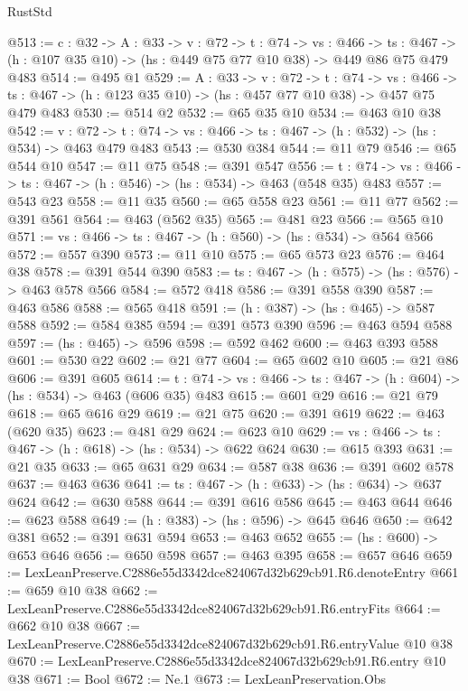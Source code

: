 \begin{lexlean}{RustStd}
\begin{coremodule}
@513 := {c : @32} ->
  {A : @33} ->
  {v : @72} ->
  {t : @74} ->
  {vs : @466} ->
  {ts : @467} -> (h : @107 @35 @10) -> (hs : @449 @75 @77 @10 @38) -> @449 @86 @75 @479 @483
@514 := @495 @1
@529 := {A : @33} ->
  {v : @72} ->
  {t : @74} ->
  {vs : @466} -> {ts : @467} -> (h : @123 @35 @10) -> (hs : @457 @77 @10 @38) -> @457 @75 @479 @483
@530 := @514 @2
@532 := @65 @35 @10
@534 := @463 @10 @38
@542 := {v : @72} ->
  {t : @74} -> {vs : @466} -> {ts : @467} -> (h : @532) -> (hs : @534) -> @463 @479 @483
@543 := @530 @384
@544 := @11 @79
@546 := @65 @544 @10
@547 := @11 @75
@548 := @391 @547
@556 := {t : @74} -> {vs : @466} -> {ts : @467} -> (h : @546) -> (hs : @534) -> @463 (@548 @35) @483
@557 := @543 @23
@558 := @11 @35
@560 := @65 @558 @23
@561 := @11 @77
@562 := @391 @561
@564 := @463 (@562 @35)
@565 := @481 @23
@566 := @565 @10
@571 := {vs : @466} -> {ts : @467} -> (h : @560) -> (hs : @534) -> @564 @566
@572 := @557 @390
@573 := @11 @10
@575 := @65 @573 @23
@576 := @464 @38
@578 := @391 @544 @390
@583 := {ts : @467} -> (h : @575) -> (hs : @576) -> @463 @578 @566
@584 := @572 @418
@586 := @391 @558 @390
@587 := @463 @586
@588 := @565 @418
@591 := (h : @387) -> (hs : @465) -> @587 @588
@592 := @584 @385
@594 := @391 @573 @390
@596 := @463 @594 @588
@597 := (hs : @465) -> @596
@598 := @592 @462
@600 := @463 @393 @588
@601 := @530 @22
@602 := @21 @77
@604 := @65 @602 @10
@605 := @21 @86
@606 := @391 @605
@614 := {t : @74} -> {vs : @466} -> {ts : @467} -> (h : @604) -> (hs : @534) -> @463 (@606 @35) @483
@615 := @601 @29
@616 := @21 @79
@618 := @65 @616 @29
@619 := @21 @75
@620 := @391 @619
@622 := @463 (@620 @35)
@623 := @481 @29
@624 := @623 @10
@629 := {vs : @466} -> {ts : @467} -> (h : @618) -> (hs : @534) -> @622 @624
@630 := @615 @393
@631 := @21 @35
@633 := @65 @631 @29
@634 := @587 @38
@636 := @391 @602 @578
@637 := @463 @636
@641 := {ts : @467} -> (h : @633) -> (hs : @634) -> @637 @624
@642 := @630 @588
@644 := @391 @616 @586
@645 := @463 @644
@646 := @623 @588
@649 := (h : @383) -> (hs : @596) -> @645 @646
@650 := @642 @381
@652 := @391 @631 @594
@653 := @463 @652
@655 := (hs : @600) -> @653 @646
@656 := @650 @598
@657 := @463 @395
@658 := @657 @646
@659 := LexLeanPreserve.C2886e55d3342dce824067d32b629cb91.R6.denoteEntry
@661 := @659 @10 @38
@662 := LexLeanPreserve.C2886e55d3342dce824067d32b629cb91.R6.entryFits
@664 := @662 @10 @38
@667 := LexLeanPreserve.C2886e55d3342dce824067d32b629cb91.R6.entryValue @10 @38
@670 := LexLeanPreserve.C2886e55d3342dce824067d32b629cb91.R6.entry @10 @38
@671 := Bool
@672 := Ne.{1}
@673 := LexLeanPreservation.Obs

\end{coremodule}
\end{lexlean}
